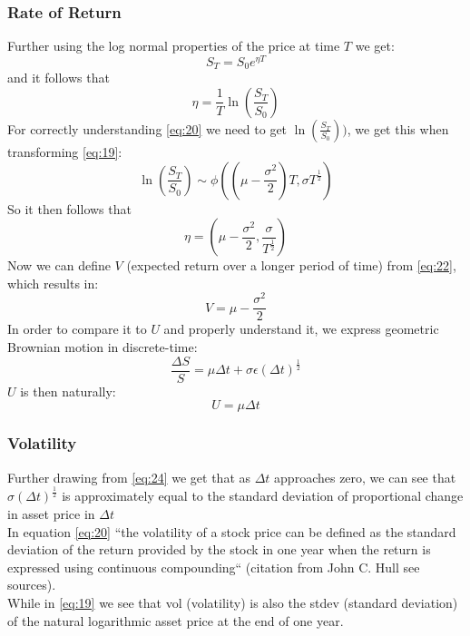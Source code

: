 \documentclass{article}
\begin{document}
\subsubsection{Rate of Return}
Further using the log normal properties of the price at time $T$ we get: 
\begin{equation*}
    S_{T} = S_{0} e^{\eta T}
\end{equation*}
and it follows that 
\begin{equation} \label{eq:20}
    \eta = \frac{1}{T} \ln\left(\frac{S_{T}}{S_{0}}\right)
\end{equation}
For correctly understanding \ref{eq:20} we need to get $\ln\left(\frac{S_{T}}{S_{0}}\right))$, we get this when transforming \ref{eq:19}: 
\begin{equation}\label{eq:21}
    \ln\left(\frac{S_{T}}{S_{0}}\right) \sim \phi\left(\left(\mu - \frac{\sigma^{2}}{2}\right)T, \sigma T^{\frac{1}{2}}\right)
\end{equation}
So it then follows that 
\begin{equation} \label{eq:22}
    \eta = \left(\mu - \frac{\sigma^{2}}{2}, \frac{\sigma} {T^{\frac{1}{2}}}\right)
\end{equation}
Now we can define $V$ (expected return over a longer period of time) from \ref{eq:22}, which results in:
\begin{equation} \label{eq:23}
    V = \mu - \frac{\sigma^{2}}{2}
\end{equation}
In order to compare it to $U$ and properly understand it, we express geometric Brownian motion in discrete-time:
\begin{equation} \label{eq:24}
    \frac{\Delta S}{S} = \mu \Delta t + \sigma \epsilon (\Delta t)^{\frac{1}{2}}
\end{equation}
$U$ is then naturally:
\begin{equation} \label{eq:25}
    U = \mu \Delta t
\end{equation}
\subsubsection{Volatility}
Further drawing from \ref{eq:24} we get that as $\Delta t$ approaches zero, we can see that $\sigma (\Delta t)^{\frac{1}{2}}$ is approximately equal to the standard deviation of proportional change in asset price in $\Delta t$ \\ [2ex]
In equation \ref{eq:20} “the volatility of a stock price can be defined as the standard deviation of the return provided by the stock in one year when the return is expressed using continuous compounding“ (citation from John C. Hull see sources).\\ [2ex]
While in \ref{eq:19} we see that vol (volatility) is also the stdev (standard deviation) of the natural logarithmic asset price  at the end of one year.
\end{document}

